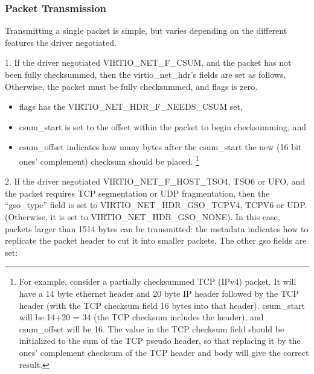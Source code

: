 \subsubsection{Packet Transmission}\label{sec:Device Types / Network Device / Device Operation / Packet Transmission}

Transmitting a single packet is simple, but varies depending on
the different features the driver negotiated.

1. If the driver negotiated VIRTIO_NET_F_CSUM, and the packet has
  not been fully checksummed, then the virtio_net_hdr's fields
  are set as follows. Otherwise, the packet must be fully
  checksummed, and flags is zero.

\begin{itemize}
  \item flags has the VIRTIO_NET_HDR_F_NEEDS_CSUM set,

  \item csum_start is set to the offset within the packet to begin checksumming,
    and

  \item csum_offset indicates how many bytes after the csum_start the
    new (16 bit ones' complement) checksum should be placed.
\footnote{For example, consider a partially checksummed TCP (IPv4) packet.
It will have a 14 byte ethernet header and 20 byte IP header
followed by the TCP header (with the TCP checksum field 16 bytes
into that header). csum_start will be 14+20 = 34 (the TCP
checksum includes the header), and csum_offset will be 16. The
value in the TCP checksum field should be initialized to the sum
of the TCP pseudo header, so that replacing it by the ones'
complement checksum of the TCP header and body will give the
correct result.
}
\end{itemize}

2. If the driver negotiated
  VIRTIO_NET_F_HOST_TSO4, TSO6 or UFO, and the packet requires
  TCP segmentation or UDP fragmentation, then the “gso_type”
  field is set to VIRTIO_NET_HDR_GSO_TCPV4, TCPV6 or UDP.
  (Otherwise, it is set to VIRTIO_NET_HDR_GSO_NONE). In this
  case, packets larger than 1514 bytes can be transmitted: the
  metadata indicates how to replicate the packet header to cut it
  into smaller packets. The other gso fields are set:

